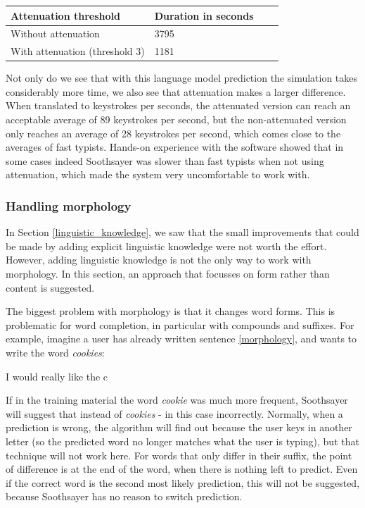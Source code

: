\documentclass[11pt]{article}
\let\originaltable\table
\let\endoriginaltable\endtable
\renewenvironment{table}[1][ht]{%
  \originaltable[#1]
  \centering}%
  {\endoriginaltable}
\begin{document}
\begin{table}[h]
\begin{tabular}{l|lll} 

Attenuation threshold&Duration in seconds\\
\hline
Without attenuation&3795\\
With attenuation (threshold 3)&1181\\
\end{tabular} 
\caption{Simulation times when using a larger corpus.} \label{larger_corpus}
\end{table}

Not only do we see that with this language model prediction the simulation takes considerably more time, we also see that attenuation makes a larger difference. When translated to keystrokes per seconds, the attenuated version can reach an acceptable average of 89 keystrokes per second, but the non-attenuated version only reaches an average of 28 keystrokes per second, which comes close to the averages of fast typists. Hands-on experience with the software showed that in some cases indeed Soothsayer was slower than fast typists when not using attenuation, which made the system very uncomfortable to work with.

\subsubsection{Handling morphology} \label{early}
In Section \ref{linguistic_knowledge}, we saw that the small improvements that could be made by adding explicit linguistic knowledge were not worth the effort. However, adding linguistic knowledge is not the only way to work with morphology. In this section, an approach that focusses on form rather than content is suggested.

The biggest problem with morphology is that it changes word forms. This is problematic for word completion, in particular with compounds and suffixes. For example, imagine a user has already written sentence \ref{morphology}, and wants to write the word \emph{cookies}:

\begin{examples}
\item I would really like the c \label{morphology}
\end{examples}

If in the training material the word \emph{cookie} was much more frequent, Soothsayer will suggest that instead of \emph{cookies} - in this case incorrectly. Normally, when a prediction is wrong, the algorithm will find out because the user keys in another letter (so the predicted word no longer matches what the user is typing), but that technique will not work here. For words that only differ in their suffix, the point of difference is at the end of the word, when there is nothing left to predict. Even if the correct word is the second most likely prediction, this will not be suggested, because Soothsayer has no reason to switch prediction.
\end{document}
